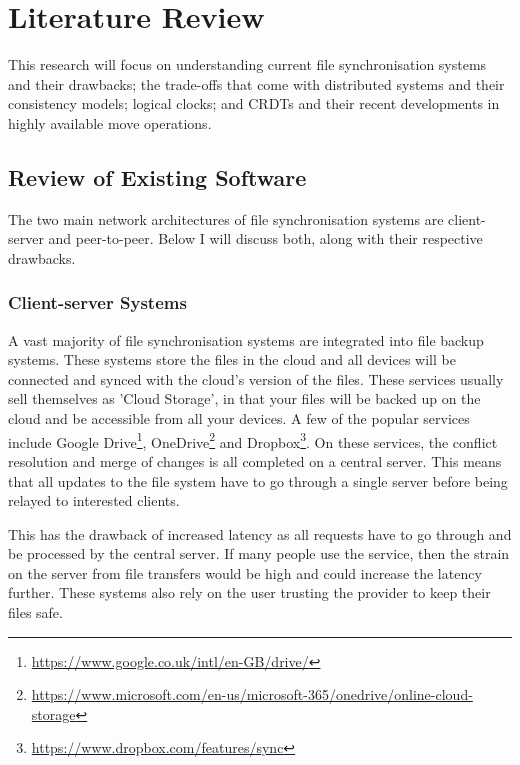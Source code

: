 \documentclass[12pt]{report}
\begin{document}
\newpage
\chapter{Literature Review}
This research will focus on understanding current file synchronisation systems and their drawbacks; the trade-offs that come with distributed systems and their consistency models; logical clocks; and CRDTs and their recent developments in highly available move operations.

\section{Review of Existing Software}
The two main network architectures of file synchronisation systems are client-server and peer-to-peer. Below I will discuss both, along with their respective drawbacks.


\subsection{Client-server Systems}
A vast majority of file synchronisation systems are integrated into file backup systems. These systems store the files in the cloud and all devices will be connected and synced with the cloud's version of the files. These services usually sell themselves as 'Cloud Storage', in that your files will be backed up on the cloud and be accessible from all your devices. A few of the popular services include Google Drive\footnote{\url{https://www.google.co.uk/intl/en-GB/drive/}}, OneDrive\footnote{\url{https://www.microsoft.com/en-us/microsoft-365/onedrive/online-cloud-storage}} and Dropbox\footnote{\url{https://www.dropbox.com/features/sync}}. On these services, the conflict resolution and merge of changes is all completed on a central server. This means that all updates to the file system have to go through a single server before being relayed to interested clients. \par

This has the drawback of increased latency as all requests have to go through and be processed by the central server. If many people use the service, then the strain on the server from file transfers would be high and could increase the latency further. These systems also rely on the user trusting the provider to keep their files safe. \par
\end{document}
